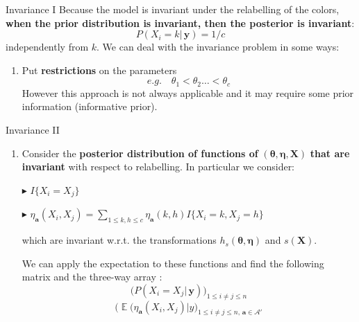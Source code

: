 \documentclass[aspectratio=169,xcolor=dvipsnames]{beamer}
\DeclareMathOperator{\E}{\mathbb{E}}
\newcommand{\veca}{\boldsymbol{a}}
\newcommand{\seta}{\mathcal{A}}
\newcommand{\vecy}{\textbf{y}}
\newcommand{\matx}{\textbf{X}}
\newcommand{\veceta}{\boldsymbol{\eta}}
\newcommand{\vectheta}{\boldsymbol{\theta}}
\begin{document}
\begin{frame}{Invariance I}
Because the model is invariant under the relabelling of the colors, \textbf{when the prior distribution is invariant, then the posterior is invariant}:
    $$
    P(X_i=k| \, \vecy) = 1/c 
    $$
independently from $k$. \pause We can deal with the invariance problem in some ways: 
\pause
\begin{enumerate}
    \item  Put \textbf{restrictions} on the parameters
    $$
    e.g. \quad \theta_1 < \theta_2 \dots < \theta_c
    $$
    However this approach is not always applicable and it may require some prior information (informative prior).
\end{enumerate}
\end{frame}
\begin{frame}{Invariance II}
\begin{enumerate}
    \item Consider the \textbf{posterior distribution of functions of} $(\vectheta, \veceta, \matx )$ \textbf{that are invariant} with respect to relabelling. \pause In particular we consider:
    \vspace{5pt}
    \addtolength{\itemindent}{24pt}
        \item[$\blacktriangleright$] $I\{X_i = X_j\}$
        \pause
        \item[$\blacktriangleright$] $\eta_{\veca}(X_i,X_j) = \displaystyle\sum_{1\leq k, h\leq c}\eta_{\veca}(k,h) I\{X_i = k, X_j = h\}$
    \addtolength{\itemindent}{-24pt}
    \vspace{5pt}
    \pause
    \item[] which are invariant w.r.t. the transformations $ h_s(\vectheta, \veceta)$ and $s(\matx)$.
    \pause
    \item[] We can apply the expectation to these functions and find the following matrix and the three-way array :
    $$
    \bigg(P(X_i=X_j | \, \vecy)\bigg)_{1\leq i \neq j \leq n}
    $$
    $$
    \bigg( \E(\eta_{\veca}(X_i,X_j)|y\bigg)_{1\leq i \neq j \leq n, \, \veca \in \seta'}
    $$
\end{enumerate}

\end{frame}
\end{document}
